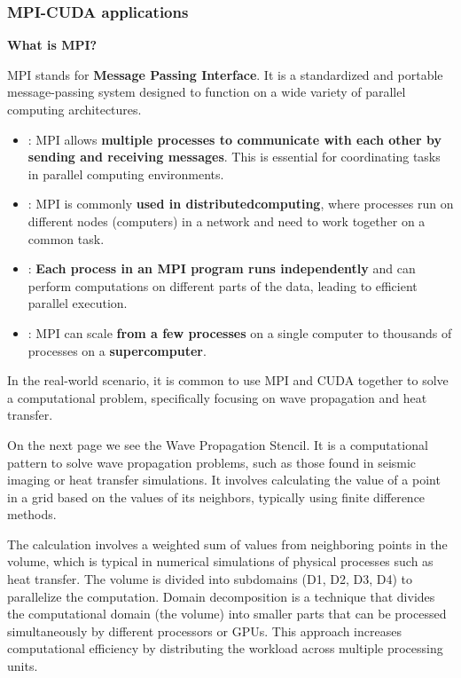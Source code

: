 \subsubsection{MPI-CUDA applications}

\begin{flushleft}
    \textcolor{Green3}{ \textbf{What is MPI?}}
\end{flushleft}
MPI stands for \textbf{Message Passing Interface}. It is a standardized and portable message-passing system designed to function on a wide variety of parallel computing architectures.
\begin{itemize}
    \item {}: MPI allows \textbf{multiple processes to communicate with each other by sending and receiving messages}. This is essential for coordinating tasks in parallel computing environments.
    \item {}: MPI is commonly \textbf{used in distributed\break computing}, where processes run on different nodes (computers) in a network and need to work together on a common task.
    \item {}: \textbf{Each process in an MPI program runs independently} and can perform computations on different parts of the data, leading to efficient parallel execution.
    \item {}: MPI can scale \textbf{from a few processes} on a single computer to thousands of processes on a \textbf{supercomputer}.
\end{itemize}
In the real-world scenario, it is common to use MPI and CUDA together to solve a computational problem, specifically focusing on wave propagation and heat transfer.

\highspace
On the next page we see the Wave Propagation Stencil. It is a computational pattern to solve wave propagation problems, such as those found in seismic imaging or heat transfer simulations. It involves calculating the value of a point in a grid based on the values of its neighbors, typically using finite difference methods.

\highspace
The calculation involves a weighted sum of values from neighboring points in the volume, which is typical in numerical simulations of physical processes such as heat transfer. The volume is divided into subdomains (D1, D2, D3, D4) to parallelize the computation. Domain decomposition is a technique that divides the computational domain (the volume) into smaller parts that can be processed simultaneously by different processors or GPUs. This approach increases computational efficiency by distributing the workload across multiple processing units.

